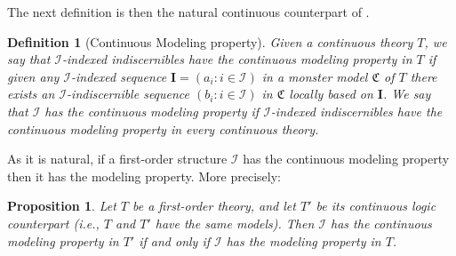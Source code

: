 \documentclass{amsart}
\newtheorem{prop}[teor]{Proposition}
\newtheorem{defin}[teor]{Definition}
\newtheorem{external claim}[teor]{Claim}
\newcommand{\C}{{\mathfrak C}}
\newcommand{\mL}{\mathcal{L}}
\newcommand{\I}{\mathcal{I}}
\newcommand{\II}{\mathbf{I}}
\begin{document}
The next definition is then the natural continuous counterpart of \cite[Definition 2.17]{SCOW20121624}.

\begin{defin}[Continuous Modeling property]\label{definition: CMP}
    Given a continuous theory $T$, we say that \emph{$\I$-indexed indiscernibles have the continuous modeling property in $T$} if given any $\I$-indexed sequence $\II=(a_i:i\in \I)$ in a monster model $\C$ of $T$ there exists an $\I$-indiscernible sequence $(b_i:i\in\I)$ in $\C$ locally based on $\II$. We say that $\I$ has the \emph{continuous modeling property} if $\I$-indexed indiscernibles have the continuous modeling property in every continuous theory.
\end{defin}

As it is natural, if a first-order structure $\I$ has the continuous modeling property then it has the modeling property. More precisely:

\begin{prop} \label{CMP implies MP}
    Let $T$ be a first-order theory, and let $T'$ be its continuous logic counterpart (i.e., $T$ and $T'$ have the same models). Then $\I$ has the continuous modeling property in $T'$ if and only if $\I$ has the modeling property in $T$.
\end{prop}
\end{document}

